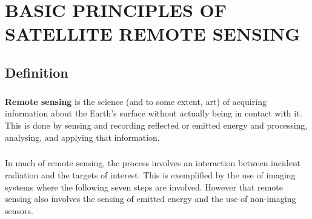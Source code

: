 \chapter{\normalsize{BASIC PRINCIPLES OF SATELLITE REMOTE SENSING}}
\section{Definition}
\paragraph{}
\textbf{Remote sensing} is the science (and to some extent, art) of acquiring information about the Earth's surface without actually being in contact with it. This is done by sensing and recording reflected or emitted energy and processing, analysing, and applying that information.
\paragraph{}
In much of remote sensing, the process involves an interaction between incident radiation 
and the targets of interest. This is exemplified by the use of imaging systems where the 
following seven steps are involved. However that remote sensing also involves the 
sensing of emitted energy and the use of non-imaging sensors. 

